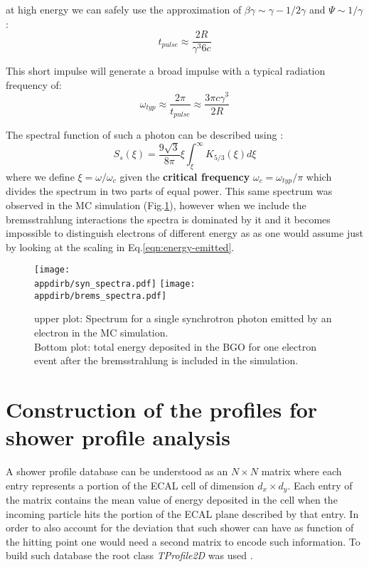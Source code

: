 at high energy we can safely use the approximation of $\beta \gamma \sim \gamma - 1/2\gamma$ and $\Psi \sim 1/\gamma$:
\[t_{pulse} \approx \frac{2 R}{\gamma^3 6c}\]

This short impulse will generate a broad impulse with a typical radiation frequency of:
\[\omega_{typ} \approx \frac{2 \pi}{t_{pulse}} \approx \frac{3 \pi  c \gamma^3}{2 R} \]

The spectral function of such a photon can be described using \cite{synchrotron-radiation}:
\begin{equation}
\label{eqn:sync_spectrum}
S_s(\xi) = \frac{9 \sqrt{3}}{8 \pi}\xi \int_{\xi}^{\infty}K_{5/3}(\xi)d\xi
\end{equation}
where we define $\xi = \omega/\omega_c$ given the \textbf{critical frequency} $\omega_c =\omega_{typ}/\pi$ which divides the spectrum in two parts of equal power. This same spectrum was observed in the MC simulation (Fig.\ref{fig:synch_spectrum}), however when we include the bremsstrahlung interactions the spectra is dominated by it and it becomes impossible to distinguish electrons of different energy as as one would assume just by looking at the scaling in Eq.\ref{eqn:energy-emitted}.


\begin{figure}[h!]
\centering
\texttt{[image: \\appdirb/syn\_spectra.pdf]}
\texttt{[image: \\appdirb/brems\_spectra.pdf]}
\caption{upper plot: Spectrum for a single synchrotron photon emitted by an electron in the MC simulation. \\
Bottom plot: total energy deposited in the BGO for one electron event after the bremsstrahlung is included in the simulation.}
\label{fig:synch_spectrum}
\end{figure}

\section{Construction of the profiles for shower profile analysis}
\label{Appb:sec:make_profile}

A shower profile database can be understood as an $N\times N$ matrix
where each entry represents a portion of the ECAL cell of dimension
$d_x \times d_y$. Each entry of the matrix contains the mean value of
energy deposited in the cell when the incoming particle hits the
portion of the ECAL plane described by that entry. In order to also
account for the deviation that such shower can have as function of the
hitting point one would need a second matrix to encode such
information. To build such database the root class \textit{TProfile2D} was used \cite{root-tprofile}.

